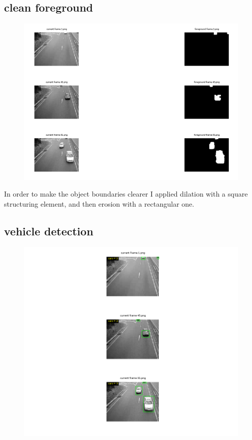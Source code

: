 \documentclass{article}
\begin{document}
	\subsection{clean foreground}
	\begin{figure}[H]
		\includegraphics[width=\linewidth]{Q3/partB/partB.png}
	\end{figure}
	In order to make the object boundaries clearer I applied dilation with a square structuring element, and then erosion with a rectangular one.
	
	\subsection{vehicle detection}
	\begin{figure}[H]
		\includegraphics[width=\linewidth]{Q3/partC/partC.png}
	\end{figure}
	
\end{document}
